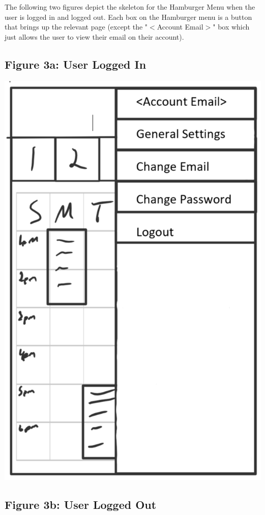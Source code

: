 \documentclass{scrreprt}
\begin{document}
The following two figures depict the skeleton for the Hamburger Menu when the user is logged in and logged out. Each box on the Hamburger menu is a button that brings up the relevant page (except the "$<$Account Email$>$" box which just allows the user to view their email on their account).

\subsection{Figure 3a: User Logged In}

\begin{center}
\includegraphics{hmlogin.PNG}
\end{center}

\subsection{Figure 3b: User Logged Out}
\end{document}
